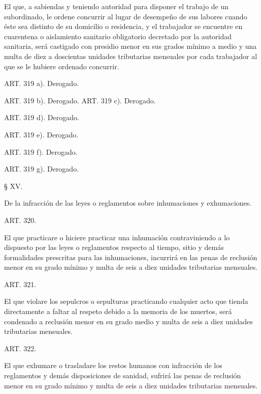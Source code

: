     El que, a sabiendas y teniendo autoridad para disponer el trabajo de un subordinado, le ordene concurrir al lugar de desempeño de sus labores cuando éste sea distinto de su domicilio o residencia, y el trabajador se encuentre en cuarentena o aislamiento sanitario obligatorio decretado por la autoridad sanitaria, será castigado con presidio menor en sus grados mínimo a medio y una multa de diez a doscientas unidades tributarias mensuales por cada trabajador al que se le hubiere ordenado concurrir.

    ART. 319 a).    Derogado.

    ART. 319 b).    Derogado.
    ART. 319 c).    Derogado.

    ART. 319 d).    Derogado.

    ART. 319 e).    Derogado.

    ART. 319 f).    Derogado.

    ART. 319 g).    Derogado.


    § XV.

    De la infracción de las leyes o reglamentos sobre inhumaciones y exhumaciones.





    ART. 320.

    El que practicare o hiciere practicar una inhumación contraviniendo a lo dispuesto por las leyes o reglamentos respecto al tiempo, sitio y demás formalidades prescritas para las inhumaciones, incurrirá en las penas de reclusión menor en su grado mínimo y multa de seis a diez unidades tributarias mensuales.








    ART. 321.

    El que violare los sepulcros o sepulturas practicando cualquier acto que tienda directamente a faltar al respeto debido a la memoria de los muertos, será condenado a reclusión menor en su grado medio y multa de seis a diez unidades tributarias mensuales.









    ART. 322.

    El que exhumare o trasladare los restos humanos con infracción de los reglamentos y demás disposiciones de sanidad, sufrirá las penas de reclusión menor en su grado mínimo y multa de seis a diez unidades tributarias mensuales.









